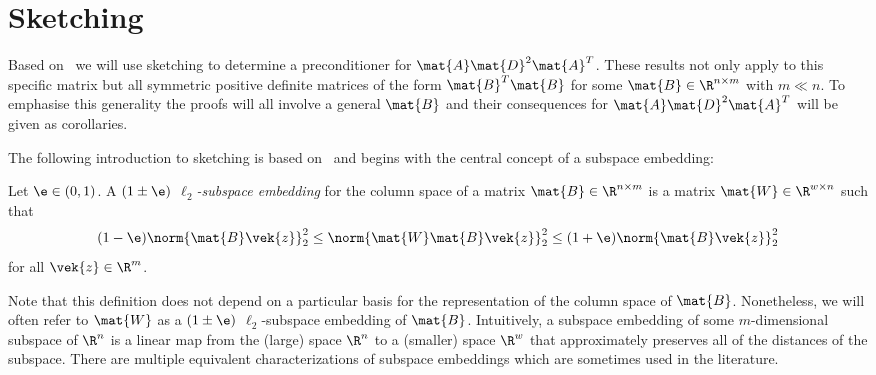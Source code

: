 \chapter{Sketching}\label{chap:sketching}



Based on~\cite{Avron-FasterRandomizedInfeasibleIPMs} we will use sketching to determine a preconditioner for \(\mat{A} \mat{D}^2 \mat{A}^T\).
These results not only apply to this specific matrix but all symmetric positive definite matrices of the form \(\mat{B}^T \mat{B}\) for some \(\mat{B} \in \R^{n \times m}\) with \(m \ll n\).
To emphasise this generality the proofs will all involve a general \(\mat{B}\) and their consequences for \(\mat{A}\mat{D}^2\mat{A}^T\) will be given as corollaries.

The following introduction to sketching is based on~\cite{Woodruff-Sketching} and begins with the central concept of a subspace embedding:
\begin{definition}\label{def:subspace-embedding}
Let \(\e \in (0, 1)\). A \emph{\((1 \pm \e)\) \(\ell_2\)-subspace embedding} for the column space of a matrix \(\mat{B} \in \R^{n \times m}\) is a matrix \(\mat{W} \in \R^{w \times n}\) such that
\[ (1-\e) \norm{\mat{B}\vek{z}}_2^2 \leq \norm{\mat{W}\mat{B}\vek{z}}_2^2 \leq (1+\e)\norm{\mat{B}\vek{z}}_2^2 \]
for all \(\vek{z} \in \R^m\).
\end{definition}
Note that this definition does not depend on a particular basis for the representation of the column space of \(\mat{B}\).
Nonetheless, we will often refer to \(\mat{W}\) as a \((1\pm\e)\) \(\ell_2\)-subspace embedding of \(\mat{B}\).
Intuitively, a subspace embedding of some \(m\)-dimensional subspace of \(\R^n\) is a linear map from the (large) space \(\R^n\) to a (smaller) space \(\R^w\) that approximately preserves all of the distances of the subspace.
There are multiple equivalent characterizations of subspace embeddings which are sometimes used in the literature.

